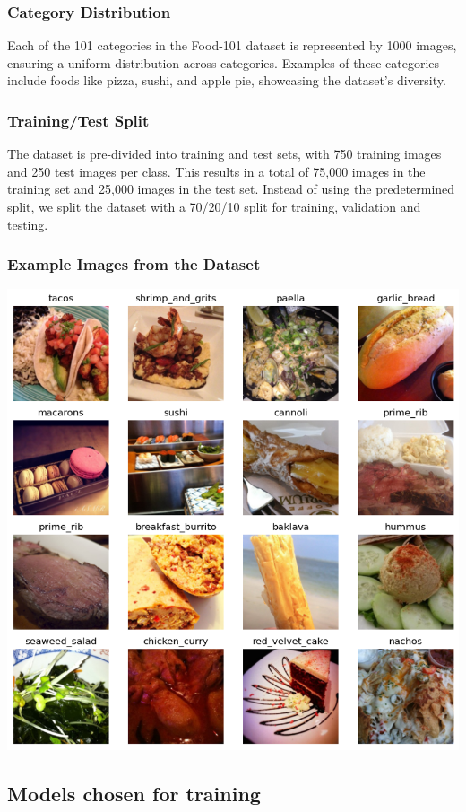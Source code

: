 \documentclass{article}
\begin{document}
\subsubsection{Category Distribution}
Each of the 101 categories in the Food-101 dataset is represented by 1000 images, ensuring a uniform distribution across categories. Examples of these categories include foods like pizza, sushi, and apple pie, showcasing the dataset's diversity.

\subsubsection{Training/Test Split}
The dataset is pre-divided into training and test sets, with 750 training images and 250 test images per class. This results in a total of 75,000 images in the training set and 25,000 images in the test set. Instead of using the predetermined split, we split the dataset with a 70/20/10 split for training, validation and testing.

\subsubsection{Example Images from the Dataset}

\begin{center}
    \includegraphics[width=0.7\linewidth]{./images/example-dataset-images.png}
\end{center}

\subsection{Models chosen for training}
\end{document}
